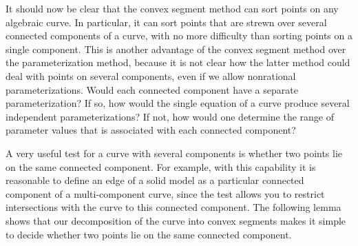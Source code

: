 It should now be clear that the convex segment method can sort points on any
algebraic curve.
In particular, it can sort points that are strewn over several connected 
components of a curve, with no more difficulty than sorting points on a single
component.
This is another advantage of the convex segment method over the parameterization
method, because it is not clear how the latter method could deal with points
on several components, even if we allow nonrational parameterizations.
%
%
Would each connected component have a separate parameterization?
If so, how would the single equation of a curve produce several independent 
parameterizations?
If not, how would one determine the range of parameter values that is associated 
with each connected component?

A very useful test for a curve with several components is whether two points 
lie on the same connected component.
For example, with this capability it is reasonable to define an edge of a solid model 
as a particular connected component of a multi-component curve, since the test allows 
you to restrict intersections with the curve to this connected component.
The following lemma shows that our decomposition of 
the curve into convex segments makes it simple to decide whether two points lie on
the same connected component.

\clearpage

